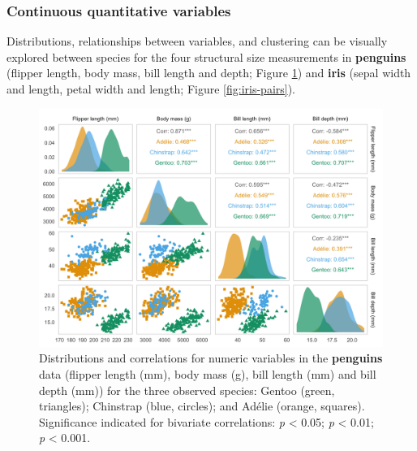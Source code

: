 \hypertarget{continuous-quantitative-variables}{%
\subsubsection{Continuous quantitative
variables}\label{continuous-quantitative-variables}}

Distributions, relationships between variables, and clustering can be
visually explored between species for the four structural size
measurements in \textbf{penguins} (flipper length, body mass, bill
length and depth; Figure \ref{fig:penguin-pairs}) and \textbf{iris}
(sepal width and length, petal width and length; Figure
\ref{fig:iris-pairs}).

\begin{Schunk}
\begin{figure}

{\centering \includegraphics[width=\textwidth]{figs/penguin-pairs-1} 

}

\caption{Distributions and correlations for numeric variables in the \textbf{penguins} data (flipper length (mm), body mass (g), bill length (mm) and bill depth (mm)) for the three observed species: Gentoo (green, triangles); Chinstrap (blue, circles); and Adélie (orange, squares). Significance indicated for bivariate correlations: \text{*}\textit{p} < 0.05; \text{*}\text{*}\textit{p} < 0.01; \text{*}\text{*}\text{*}\textit{p} < 0.001.}\label{fig:penguin-pairs}
\end{figure}
\end{Schunk}

